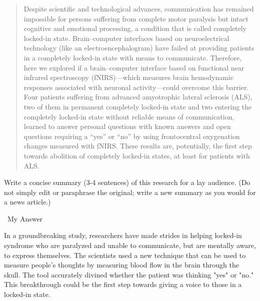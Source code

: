 \documentclass[a4paper, 12pt]{article}
\begin{document}
\vspace{4pt}\begin{quote}
Despite scientific and technological advances, communication has remained impossible for persons suffering from complete motor paralysis but intact cognitive and emotional processing, a condition that is called completely locked-in state.
Brain–computer interfaces based on neuroelectrical technology (like an electroencephalogram) have failed at providing patients in a completely locked-in state with means to communicate.
Therefore, here we explored if a brain–computer interface based on functional near infrared spectroscopy (fNIRS)—which measures brain hemodynamic responses associated with neuronal activity—could overcome this barrier. Four patients suffering from advanced amyotrophic lateral sclerosis (ALS), two of them in permanent completely locked-in state and two entering the completely locked-in state without reliable means of communication, learned to answer personal questions with known answers and open questions requiring a “yes” or “no” by using frontocentral oxygenation changes measured with fNIRS.
These results are, potentially, the first step towards abolition of completely locked-in states, at least for patients with ALS.
\end{quote}

Write a concise summary (3-4 sentences) of this research for a lay audience. (Do not simply edit or paraphrase the original; write a new summary as you would for a news article.)

\par\textbullet\ My Answer

\par In a groundbreaking study, researchers have made strides in helping locked-in syndrome who are paralyzed and unable to communicate, but are mentally aware, to express themselves.
The scientists used a new technique that can be used to measure people's thoughts by measuring blood flow in the brain through the skull.
The tool accurately divined whether the patient was thinking "yes" or "no." This breakthrough could be the first step towards giving a voice to those in a locked-in state.
\end{document}
